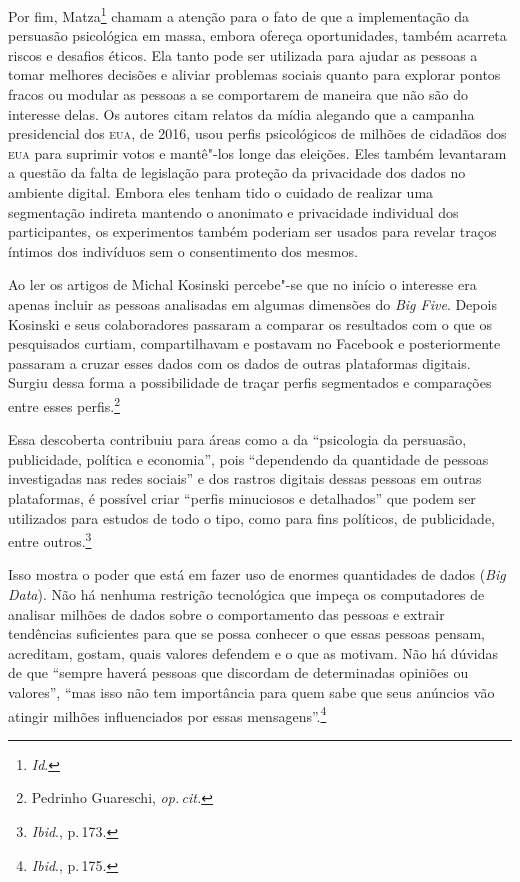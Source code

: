 Por fim, Matza\footnote{\textit{Id}.} chamam a atenção para o fato de que a
implementação da persuasão psicológica em massa, embora ofereça
oportunidades, também acarreta riscos e desafios éticos. Ela tanto pode
ser utilizada para ajudar as pessoas a tomar melhores decisões e aliviar
problemas sociais quanto para explorar pontos fracos ou modular as
pessoas a se comportarem de maneira que não são do interesse delas. Os
autores citam relatos da mídia alegando que a campanha presidencial dos
\textsc{eua}, de 2016, usou perfis psicológicos de milhões de cidadãos dos \textsc{eua}
para suprimir votos e mantê"-los longe das eleições. Eles também
levantaram a questão da falta de legislação para proteção da privacidade
dos dados no ambiente digital. Embora eles tenham tido o cuidado de
realizar uma segmentação indireta mantendo o anonimato e privacidade
individual dos participantes, os experimentos também poderiam ser usados
para revelar traços íntimos dos indivíduos sem o consentimento dos
mesmos.

Ao ler os artigos de Michal Kosinski percebe"-se que no início o
interesse era apenas incluir as pessoas analisadas em algumas dimensões
do \emph{Big Five}. Depois Kosinski e seus colaboradores passaram a
comparar os resultados com o que os pesquisados curtiam, compartilhavam
e postavam no Facebook e posteriormente passaram a cruzar esses dados
com os dados de outras plataformas digitais. Surgiu dessa forma a
possibilidade de traçar perfis segmentados e comparações entre esses
perfis.\footnote{Pedrinho Guareschi, \textit{op.\,cit.}}

Essa descoberta contribuiu para áreas como a da ``psicologia da
persuasão, publicidade, política e economia'', pois ``dependendo da
quantidade de pessoas investigadas nas redes sociais'' e dos rastros
digitais dessas pessoas em outras plataformas, é possível criar ``perfis
minuciosos e detalhados'' que podem ser utilizados para estudos de todo
o tipo, como para fins políticos, de publicidade, entre outros.\footnote{\textit{Ibid}., p.\,173.}

Isso mostra o poder que está em fazer uso de enormes quantidades de
dados (\emph{Big Data}). Não há nenhuma restrição tecnológica que impeça
os computadores de analisar milhões de dados sobre o comportamento das
pessoas e extrair tendências suficientes para que se possa conhecer o
que essas pessoas pensam, acreditam, gostam, quais valores defendem e o que as motivam. Não há dúvidas de que ``sempre haverá pessoas que discordam de determinadas opiniões ou valores'', ``mas isso não tem
importância para quem sabe que seus anúncios vão atingir milhões
influenciados por essas mensagens''.\footnote{\textit{Ibid}., p.\,175.}

